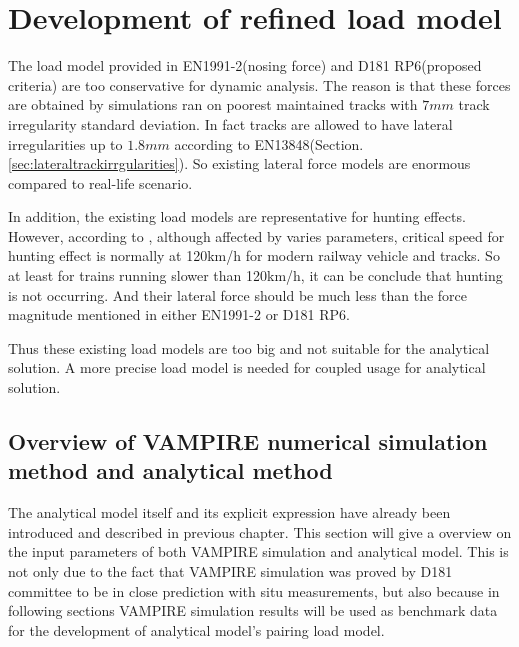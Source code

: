 \section{Development of refined load model}\label{sec:refinedloadmodel}

The load model provided in EN1991-2(nosing force) and D181 RP6(proposed criteria) are too conservative for dynamic analysis. The reason is that these forces are obtained by simulations ran on poorest maintained tracks with $7mm$ track irregularity standard deviation. In fact tracks are allowed to have lateral irregularities up to $1.8mm$ according to EN13848(Section.\ref{sec:lateraltrackirrgularities}). So existing lateral force models are enormous compared to real-life scenario. 

In addition, the existing load models are representative for hunting effects\citet[Proposed criteria]{d181}. However, according to \citet{majka2008effects}, although affected by varies parameters, critical speed for hunting effect is normally at 120km/h for modern railway vehicle and tracks. So at least for trains running slower than 120km/h, it can be conclude that hunting is not occurring. And their lateral force should be much less than the force magnitude mentioned in either EN1991-2 or D181 RP6.

Thus these existing load models are too big and not suitable for the analytical solution. A more precise load model is needed for coupled usage for analytical solution.

\subsection{Overview of VAMPIRE numerical simulation method and analytical method}\label{sec:overviewvampireanalytical}

The analytical model itself and its explicit expression have already been introduced and described in previous chapter. This section will give a overview on the input parameters of both VAMPIRE simulation and analytical model. This is not only due to the fact that VAMPIRE simulation was proved by D181 committee to be in close prediction with situ measurements, but also because in following sections VAMPIRE simulation results will be used as benchmark data for the development of analytical model's pairing load model. 

